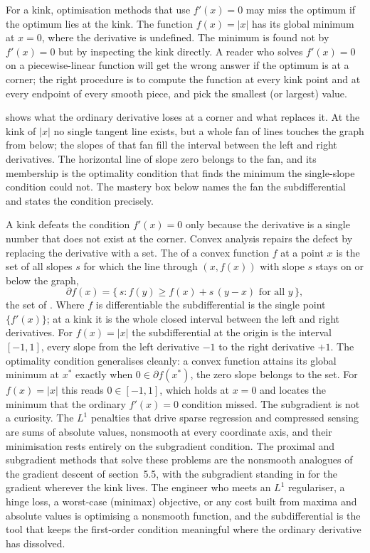 For a kink, optimisation methods that use $f'(x) = 0$ may miss
the optimum if the optimum lies at the kink. The function
$f(x) = |x|$ has its global minimum at $x = 0$, where the
derivative is undefined. The minimum is found not by $f'(x) = 0$
but by inspecting the kink directly. A reader who solves
$f'(x) = 0$ on a piecewise-linear function will get the wrong
answer if the optimum is at a corner; the right procedure is to
compute the function at every kink point and at every endpoint
of every smooth piece, and pick the smallest (or largest) value.



 shows what the ordinary
derivative loses at a corner and what replaces it. At the kink of
$|x|$ no single tangent line exists, but a whole fan of lines
touches the graph from below; the slopes of that fan fill the
interval between the left and right derivatives. The horizontal line
of slope zero belongs to the fan, and its membership is the
optimality condition that finds the minimum the single-slope
condition could not. The mastery box below names the fan the
subdifferential and states the condition precisely.

\begin{mastery}
A kink defeats the condition $f'(x) = 0$ only because the derivative is a
single number that does not exist at the corner. Convex analysis repairs
the defect by replacing the derivative with a set. The
 of a convex function $f$ at a point $x$ is the
set of all slopes $s$ for which the line through $(x, f(x))$ with slope
$s$ stays on or below the graph,
\[
\partial f(x) = \{\, s : f(y) \geq f(x) + s\,(y - x) \text{ for all } y
\,\},
\]
the set of . Where $f$ is differentiable the
subdifferential is the single point $\{f'(x)\}$; at a kink it is the
whole closed interval between the left and right derivatives. For
$f(x) = |x|$ the subdifferential at the origin is the interval
$[-1, 1]$, every slope from the left derivative $-1$ to the right
derivative $+1$. The optimality condition generalises cleanly: a convex
function attains its global minimum at $x^{*}$ exactly when
$0 \in \partial f(x^{*})$, the zero slope belongs to the set. For
$f(x) = |x|$ this reads $0 \in [-1, 1]$, which holds at $x = 0$ and
locates the minimum that the ordinary $f'(x) = 0$ condition missed. The
subgradient is not a curiosity. The $L^{1}$ penalties that drive sparse
regression and compressed sensing are sums of absolute values, nonsmooth
at every coordinate axis, and their minimisation rests entirely on the
subgradient condition. The proximal and subgradient methods that solve
these problems are the nonsmooth analogues of the gradient descent of
section~5.5, with the subgradient standing in for the gradient wherever
the kink lives. The engineer who meets an $L^{1}$ regulariser, a hinge
loss, a worst-case (minimax) objective, or any cost built from maxima and
absolute values is optimising a nonsmooth function, and the subdifferential
is the tool that keeps the first-order condition meaningful where the
ordinary derivative has dissolved.
\end{mastery}

